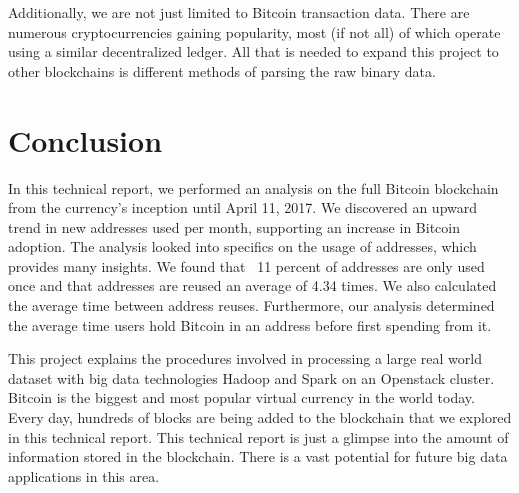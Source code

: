 \documentclass[9pt,twocolumn,twoside]{idsi}
\begin{document}
Additionally, we are not just limited to Bitcoin transaction data. There are numerous cryptocurrencies gaining popularity, most (if not all) of which operate using a similar decentralized ledger. All that is needed to expand this project to other blockchains is different methods of parsing the raw binary data.

\section{Conclusion}
In this technical report, we performed an analysis on the full Bitcoin blockchain from the currency's inception until April 11, 2017. We discovered an upward trend in new addresses used per month, supporting an increase in Bitcoin adoption. The analysis looked into specifics on the usage of addresses, which provides many insights. We found that ~11 percent of addresses are only used once and that addresses are reused an average of 4.34 times. We also calculated the average time between address reuses. Furthermore, our analysis determined the average time users hold Bitcoin in an address before first spending from it.

This project explains the procedures involved in processing a large real world dataset with big data technologies Hadoop and Spark on an Openstack cluster. Bitcoin is the biggest and most popular virtual currency in the world today. Every day, hundreds of blocks are being added to the blockchain that we explored in this technical report. This technical report is just a glimpse into the amount of information stored in the blockchain. There is a vast potential for future big data applications in this area.
\end{document}

